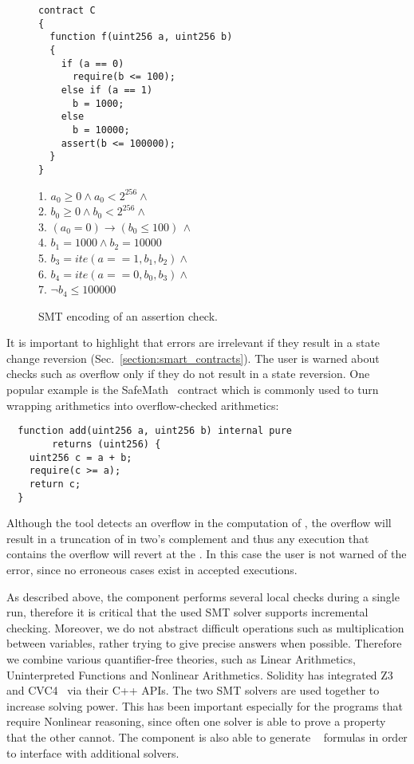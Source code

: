 \begin{figure}
\label{figure:solidity_encoding_1}
\noindent\begin{minipage}{.48\textwidth}
\begin{verbatim}
contract C
{
  function f(uint256 a, uint256 b)
  {
    if (a == 0)
      require(b <= 100);
    else if (a == 1)
      b = 1000;
    else
      b = 10000;
    assert(b <= 100000);
  }
}
\end{verbatim}
\end{minipage}\hfill
\begin{minipage}{.48\textwidth}
1. $a_0 \ge 0 \land a_0 < 2^{256}  \land \phantom{x}$\\
2. $b_0 \ge 0 \land b_0 < 2^{256}  \land \phantom{x}$\\
3. $(a_0 = 0) \rightarrow (b_0 \le 100) \, \land$\\
4. $b_1 = 1000 \land b_2 = 10000$\\
5. $b_3 = ite(a == 1, b_1, b_2) \land \phantom{x}$\\
6. $b_4 = ite(a == 0, b_0, b_3) \land \phantom{x}$\\
7. $\neg b_4 \le 100000$
\end{minipage}
\caption{SMT encoding of an assertion check.}
\end{figure}

It is important to highlight that errors are irrelevant if they result in a
state change reversion (Sec.~\ref{section:smart_contracts}). The user is warned
about checks such as overflow only if they do not result in a state reversion.
%
One popular example is the SafeMath~\cite{SafeMath} contract which
is commonly used to turn wrapping arithmetics into overflow-checked arithmetics:

\begin{verbatim}
  function add(uint256 a, uint256 b) internal pure
        returns (uint256) {
    uint256 c = a + b;
    require(c >= a);
    return c;
  }
\end{verbatim}

Although the tool detects an overflow in the computation of ,
the overflow will result in a truncation of  in two's complement and thus
any execution that contains the overflow will revert at the .
%
In this case the user is not warned of the error, since no erroneous cases
exist in accepted executions.

As described above, the component performs several local checks during a single
run, therefore it is critical that the used SMT solver supports
incremental checking.
%
Moreover, we do not abstract difficult operations such as multiplication
between variables, rather trying to give precise answers when possible.
%
Therefore we combine various quantifier-free theories, such as Linear
Arithmetics, Uninterpreted Functions and Nonlinear Arithmetics. 
%
Solidity has integrated Z3~\cite{Z3} and CVC4~\cite{CVC4} via their C++ APIs.
%
The two SMT solvers are used together to increase solving power.
%
This has been important especially for the programs that require Nonlinear
reasoning, since often one solver is able to prove a property that the other
cannot.
%
The component is also able to generate ~\cite{SMTLIB}
formulas in order to interface with additional solvers.


